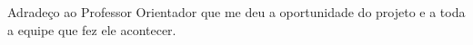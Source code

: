 \begin{agradecimentos}

Adradeço ao Professor Orientador que me deu a oportunidade do projeto e a toda a equipe que fez ele acontecer.

\end{agradecimentos}
